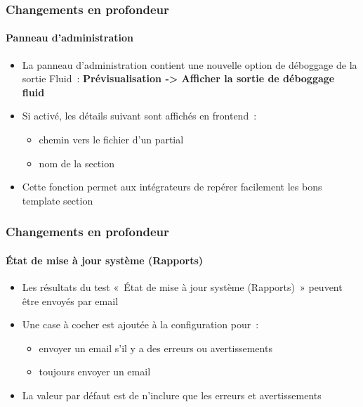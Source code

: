 \begin{frame}[fragile]
	\frametitle{Changements en profondeur}
	\framesubtitle{Panneau d'administration}

	\begin{itemize}
		\item La panneau d'administration contient une nouvelle option de déboggage
			de la sortie Fluid~:
			\textbf{Prévisualisation -> Afficher la sortie de déboggage fluid}
		\item Si activé, les détails suivant sont affichés en frontend~:

			\begin{itemize}
				\item chemin vers le fichier d'un partial
				\item nom de la section
			\end{itemize}

		\item Cette fonction permet aux intégrateurs de repérer facilement les bons template
			section

	\end{itemize}

\end{frame}






\begin{frame}[fragile]
	\frametitle{Changements en profondeur}
	\framesubtitle{État de mise à jour système (Rapports)}

	\begin{itemize}
		\item Les résultats du test «~État de mise à jour système (Rapports)~» peuvent
			être envoyés par email
		\item Une case à cocher est ajoutée à la configuration pour~:

			\begin{itemize}
				\item envoyer un email s'il y a des erreurs ou avertissements
				\item toujours envoyer un email
			\end{itemize}

		\item La valeur par défaut est de n'inclure que les erreurs et avertissements

	\end{itemize}

\end{frame}







